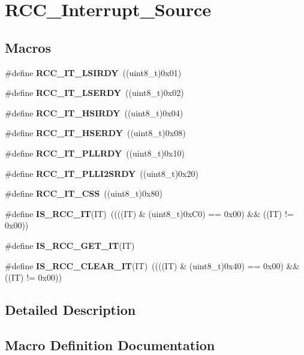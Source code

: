 \section{R\+C\+C\+\_\+\+Interrupt\+\_\+\+Source}
\label{group__RCC__Interrupt__Source}
\subsection*{Macros}
\begin{DoxyCompactItemize}
\item 
\#define \textbf{ R\+C\+C\+\_\+\+I\+T\+\_\+\+L\+S\+I\+R\+DY}~((uint8\+\_\+t)0x01)
\item 
\#define \textbf{ R\+C\+C\+\_\+\+I\+T\+\_\+\+L\+S\+E\+R\+DY}~((uint8\+\_\+t)0x02)
\item 
\#define \textbf{ R\+C\+C\+\_\+\+I\+T\+\_\+\+H\+S\+I\+R\+DY}~((uint8\+\_\+t)0x04)
\item 
\#define \textbf{ R\+C\+C\+\_\+\+I\+T\+\_\+\+H\+S\+E\+R\+DY}~((uint8\+\_\+t)0x08)
\item 
\#define \textbf{ R\+C\+C\+\_\+\+I\+T\+\_\+\+P\+L\+L\+R\+DY}~((uint8\+\_\+t)0x10)
\item 
\#define \textbf{ R\+C\+C\+\_\+\+I\+T\+\_\+\+P\+L\+L\+I2\+S\+R\+DY}~((uint8\+\_\+t)0x20)
\item 
\#define \textbf{ R\+C\+C\+\_\+\+I\+T\+\_\+\+C\+SS}~((uint8\+\_\+t)0x80)
\item 
\#define \textbf{ I\+S\+\_\+\+R\+C\+C\+\_\+\+IT}(IT)~((((IT) \& (uint8\+\_\+t)0x\+C0) == 0x00) \&\& ((\+I\+T) != 0x00))
\item 
\#define \textbf{ I\+S\+\_\+\+R\+C\+C\+\_\+\+G\+E\+T\+\_\+\+IT}(IT)
\item 
\#define \textbf{ I\+S\+\_\+\+R\+C\+C\+\_\+\+C\+L\+E\+A\+R\+\_\+\+IT}(IT)~((((IT) \& (uint8\+\_\+t)0x40) == 0x00) \&\& ((\+I\+T) != 0x00))
\end{DoxyCompactItemize}


\subsection{Detailed Description}


\subsection{Macro Definition Documentation}
\mbox{\label{group__RCC__Interrupt__Source_ga8374741e47d696accd1a72647650ba63}} 
